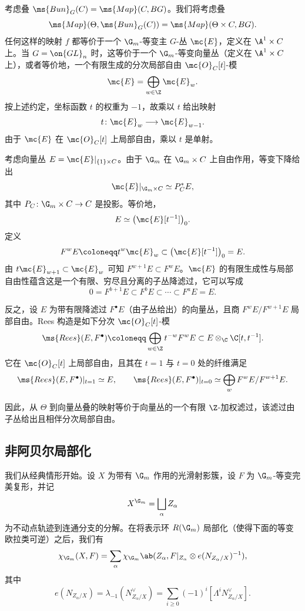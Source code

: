 考虑叠 \(\ms{Bun}_G(C) = \ms{Map}(C, BG)\)。我们将考虑叠
\[ \ms{Map}(\Theta, \ms{Bun}_G(C)) = \ms{Map}(\Theta \times C, BG). \]
任何这样的映射 \(f\) 都等价于一个 \(\G_m\)-等变主 \(G\)-丛 \(\mc{E}\)，定义在 \(\A^1\times C\) 上。当 \(G=\on{GL}_n\) 时，这等价于一个 \(\G_m\)-等变向量丛（定义在 \(\A^1\times C\) 上），或者等价地，一个有限生成的分次局部自由 \(\mc{O}_C[t]\)-模
\[
    \mc{E}=\bigoplus_{w\in\Z}\mc{E}_w.
\]
按上述约定，坐标函数 \(t\) 的权重为 \(-1\)，故乘以 \(t\) 给出映射
\[
    t\colon\mc{E}_w\longrightarrow\mc{E}_{w-1}.
\]
由于 \(\mc{E}\) 在 \(\mc{O}_C[t]\) 上局部自由，乘以 \(t\) 是单射。

\begin{rmk}
    考虑向量丛 \(E=\mc{E}|_{\{1\}\times C}\)。由于 \(\G_m\) 在 \(\G_m\times C\) 上自由作用，等变下降给出
    \[
        \mc{E}|_{\G_m\times C}\simeq P_C^*E,
    \]
    其中 \(P_C\colon\G_m\times C\to C\) 是投影。等价地，
    \[
        E\simeq\big(\mc{E}[t^{-1}]\big)_0.
    \]
    定义
    \[
        F^wE\coloneqq t^w\mc{E}_w\subset\big(\mc{E}[t^{-1}]\big)_0=E.
    \]
    由 \(t\mc{E}_{w+1}\subset\mc{E}_w\) 可知 \(F^{w+1}E\subset F^wE\)。\(\mc{E}\) 的有限生成性与局部自由性蕴含这是一个有限、穷尽且分离的子丛降滤过，它可以写成
    \[
        0=F^{b+1}E\subset F^bE\subset\cdots\subset F^aE=E.
    \]

    反之，设 \(E\) 为带有限降滤过 \(F^\bullet E\)（由子丛给出）的向量丛，且商 \(F^wE/F^{w+1}E\) 局部自由。Rees 构造是如下分次 \(\mc{O}_C[t]\)-模
    \[
        \ms{Rees}(E,F^\bullet)
        \coloneqq
        \bigoplus_{w\in\Z}t^{-w}F^wE
        \subset
        E\otimes_{\C}\C[t,t^{-1}].
    \]
    它在 \(\mc{O}_C[t]\) 上局部自由，且其在 \(t=1\) 与 \(t=0\) 处的纤维满足
    \[
        \ms{Rees}(E,F^\bullet)|_{t=1}\simeq E,
        \qquad
        \ms{Rees}(E,F^\bullet)|_{t=0}
        \simeq
        \bigoplus_w F^wE/F^{w+1}E.
    \]
\end{rmk}

因此，从 \(\Theta\) 到向量丛叠的映射等价于向量丛的一个有限 \(\Z\)-加权滤过，该滤过由子丛给出且相伴分次局部自由。


\subsection{非阿贝尔局部化}%
\label{sub:Non-abelian localization}

我们从经典情形开始。设 \(X\) 为带有 \(\G_m\) 作用的光滑射影簇，设 \(F\) 为 \(\G_m\)-等变完美复形，并记
\[
    X^{\G_m}=\bigsqcup_\alpha Z_\alpha
\]
为不动点轨迹到连通分支的分解。在将表示环 \(R(\G_m)\) 局部化（使得下面的等变欧拉类可逆）之后，我们有
\[
    \chi_{\G_m}(X,F)
    =
    \sum_\alpha
    \chi_{\G_m}\ab(
        Z_\alpha,
        F|_{Z_\alpha}\otimes e(N_{Z_\alpha/X})^{-1}
    ),
\]
其中
\[
    e(N_{Z_\alpha/X})
    =
    \lambda_{-1}(N_{Z_\alpha/X}^\vee)
    =
    \sum_{i\geq0}(-1)^i[\Lambda^iN_{Z_\alpha/X}^\vee].
\]

